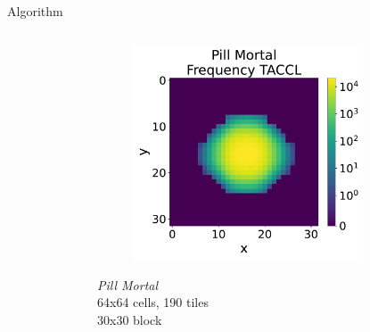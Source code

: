 \documentclass{beamer}
\begin{document}
%
%
%
  \begin{frame}[fragile]{Algorithm}

    \begin{columns}[T,onlytextwidth]
        \begin{block}{}
          \begin{figure}
          \end{figure}
        \end{block}
        \begin{block}{}
          \begin{figure}
            \includegraphics[width=0.8\textwidth]{img/pm_freq_taccl.pdf}
          \end{figure}
          \begin{centering}
          \textit{Pill Mortal} \\
          64x64 cells, 190 tiles \\
          30x30 block \\
          \end{centering}
        \end{block}
    \end{columns}

  \end{frame}
\end{document}
